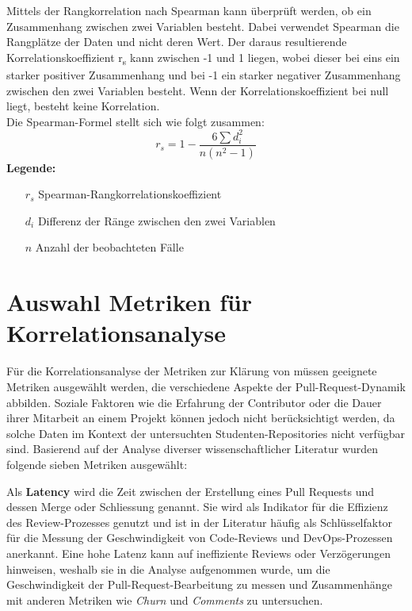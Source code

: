 Mittels der Rangkorrelation nach Spearman \parencite{noauthor_t-test_nodate} kann überprüft werden, ob ein Zusammenhang zwischen zwei Variablen besteht. Dabei verwendet Spearman die Rangplätze der Daten und nicht deren Wert. Der daraus resultierende Korrelationskoeffizient r\textsubscript{s} kann zwischen -1 und 1 liegen, wobei dieser bei eins ein starker positiver Zusammenhang und bei -1 ein starker negativer Zusammenhang zwischen den zwei Variablen besteht. Wenn der Korrelationskoeffizient bei null liegt, besteht keine Korrelation. \parencite{noauthor_t-test_nodate}  \\
Die Spearman-Formel \parencite{noauthor_t-test_nodate} stellt sich wie folgt zusammen: 
\begin{equation}
r_s = 1 - \frac{6 \sum d_i^2}{n(n^2 - 1)}
\end{equation}
\label{eqn:spearman}
\noindent\textbf{Legende:}
\begin{itemize}
  \item [$r_s$] Spearman-Rangkorrelationskoeffizient
  \item[$d_i$] Differenz der Ränge zwischen den zwei Variablen 
  \item[$n$] Anzahl der beobachteten Fälle
\end{itemize}


\section{Auswahl Metriken für Korrelationsanalyse}
Für die Korrelationsanalyse der Metriken zur Klärung von  müssen geeignete Metriken ausgewählt werden, die verschiedene Aspekte der Pull-Request-Dynamik abbilden. Soziale Faktoren wie die Erfahrung der Contributor oder die Dauer ihrer Mitarbeit an einem Projekt können jedoch nicht berücksichtigt werden, da solche Daten im Kontext der untersuchten Studenten-Repositories nicht verfügbar sind. Basierend auf der Analyse diverser wissenschaftlicher Literatur wurden folgende sieben Metriken ausgewählt:

Als \textbf{Latency} wird die Zeit zwischen der Erstellung eines Pull Requests und dessen Merge oder Schliessung genannt. Sie wird als Indikator für die Effizienz des Review-Prozesses genutzt und ist in der Literatur häufig als Schlüsselfaktor für die Messung der Geschwindigkeit von Code-Reviews und DevOps-Prozessen anerkannt. Eine hohe Latenz kann auf ineffiziente Reviews oder Verzögerungen hinweisen, weshalb sie in die Analyse aufgenommen wurde, um die Geschwindigkeit der Pull-Request-Bearbeitung zu messen und Zusammenhänge mit anderen Metriken wie \textit{Churn} und \textit{Comments} zu untersuchen. \parencite{yu_wait_2015}

